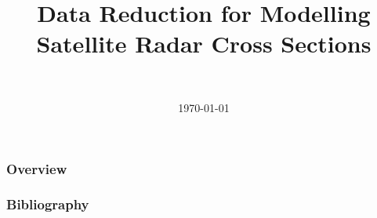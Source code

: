 \documentclass[]{beamer}
\title[Data Reduction]{Data Reduction for Modelling\\ Satellite Radar Cross Sections}
\author[Daniel Topa]{\TopaHII \\ \TopaHIIEmail}
\institute{\missiontech}
\date{\today}
\begin{document}
\begin{frame}
	\titlepage
\end{frame}

	

\begin{frame}\frametitle{Overview}
	\tableofcontents[hideallsubsections]
\end{frame}

	
	
	

{\tiny{
\begin{frame}[allowframebreaks]\frametitle{Bibliography}
	\printbibliography
\end{frame}}}

\begin{frame}
	\titlepage
\end{frame}
\end{document}
